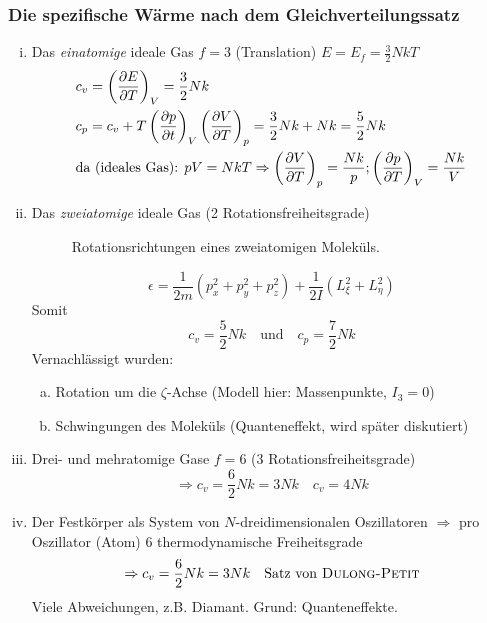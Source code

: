 \subsubsection{Die spezifische Wärme nach dem Gleichverteilungssatz}
\begin{enumerate}[i)]
    \item Das \emph{einatomige} ideale Gas $f=3$ (Translation) $E = E_f = \frac{3}{2} N k T$
    \begin{equation}
        \begin{split}
            & c_v = \left( \frac{\partial E}{\partial T} \right)_{V} = \frac{3}{2} N k \\
            & c_p = c_v + T \left( \frac{\partial p}{\partial t} \right)_{V} \left( \frac{\partial V}{\partial T} \right)_{p} = \frac{3}{2} N k + N k = \frac{5}{2} N k \\
            & \text{da (ideales Gas): } pV = N k T \Rightarrow \left( \frac{\partial V}{\partial T} \right)_{p} = \frac{N k }{p}; \left( \frac{\partial p}{\partial T} \right)_{V} = \frac{N k}{V}
        \end{split}
    \end{equation}
    \item Das \emph{zweiatomige} ideale Gas (2 Rotationsfreiheitsgrade)
    
    \begin{figure}[H]
        \centering
        \def\svgwidth{0.5\textwidth}
        
        \caption{Rotationsrichtungen eines zweiatomigen Moleküls.}
        \label{img:2atomicGasRotationDirections}
    \end{figure}
    
    \begin{equation}
        \epsilon = \frac{1}{2 m} \left( p_x^2 + p_y^2 + p_z^2 \right) + \frac{1}{2 I} \left( L_\xi^2 + L_\eta^2 \right)
    \end{equation}
    Somit
    \begin{equation}
        c_v = \frac{5}{2} N k \quad \text{und} \quad c_p = \frac{7}{2} N k
    \end{equation}
    Vernachlässigt wurden:
    \begin{enumerate}[a)]
        \item Rotation um die $\zeta$-Achse (Modell hier: Massenpunkte, $I_3 = 0$)
        \item Schwingungen des Moleküls (Quanteneffekt, wird später diskutiert)
    \end{enumerate}
    \item Drei- und mehratomige Gase $f = 6$ (3 Rotationsfreiheitsgrade)
    \begin{equation}
        \Rightarrow c_v = \frac{6}{2} N k = 3 N k \quad c_v = 4 N k
    \end{equation}
    \item Der Festkörper als System von $N$-dreidimensionalen Oszillatoren $\Rightarrow$ pro Oszillator (Atom) 6 thermodynamische Freiheitsgrade
    \begin{equation}
        \Rightarrow c_v = \frac{6}{2} N k = 3 N k \quad \text{Satz von \textsc{Dulong-Petit}}
    \end{equation}
    Viele Abweichungen, z.B. Diamant. Grund: Quanteneffekte.
\end{enumerate}
